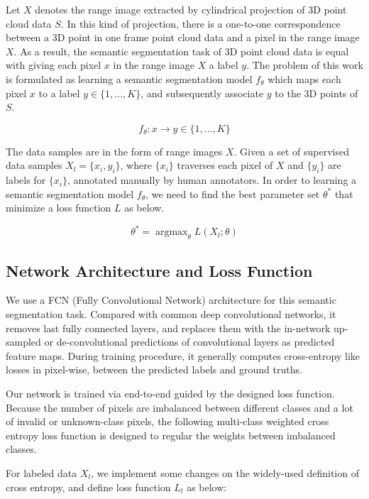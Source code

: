 Let $X$ denotes the range image extracted by cylindrical projection of 3D point cloud data $S$. In this kind of projection, there is a one-to-one correspondence between a 3D point in one frame point cloud data and a pixel in the range image $X$. As a result, the semantic segmentation task of 3D point cloud data is equal with giving each pixel $x$ in the range image $X$ a label $y$. The problem of this work is formulated as learning a semantic segmentation model $f_{\theta}$ which maps each pixel $x$ to a label $y\in\{1,...,K\}$, and subsequently associate $y$ to the 3D points of $S$.

\begin{equation}
f_{\theta}: x\to y \in \{1,...,K\}
\end{equation}

The data samples are in the form of range images $X$. Given a set of supervised data samples $X_l=\{x_i, y_i\}$, where $\{x_i\}$ traverses each pixel of $X$ and $\{y_i\}$ are labels for $\{x_i\}$, annotated manually by human annotators. 
In order to learning a semantic segmentation model $f_\theta$, we need to find the best parameter set $\theta^*$ that minimize a loss function $L$ as below.

\begin{equation}
\theta^{*}=\mathop{\arg\max}_{\theta}L(X_l; \theta)
\end{equation}

\subsection{Network Architecture and Loss Function}
We use a FCN (Fully Convolutional Network) architecture for this semantic segmentation task.
Compared with common deep convolutional networks, it removes last fully connected layers, and replaces them with the in-network up-sampled or de-convolutional predictions of convolutional layers as predicted feature maps. During training procedure, it generally computes cross-entropy like losses in pixel-wise, between the predicted labels and ground truths.

Our network is trained via end-to-end guided by the designed loss function. Because the number of pixels are imbalanced between different classes and a lot of invalid or unknown-class pixels, the following multi-class weighted cross entropy loss function is designed to regular the weights between imbalanced classes.

For labeled data $X_l$, we implement some changes on the widely-used definition of cross entropy, and define loss function $L_l$ as below:

